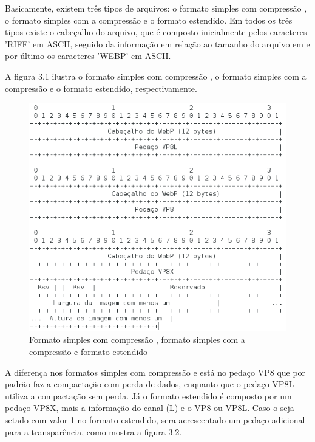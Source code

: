 \documentclass[espaco=simples,appendix=Name]{abnt}
\begin{document}
Basicamente, existem três tipos de arquivos: o formato simples com compressão , o formato simples com a compressão  e o formato estendido. Em todos os três tipos existe o cabeçalho do arquivo, que é composto inicialmente pelos caracteres 'RIFF' em ASCII, seguido da informação em relação ao tamanho do arquivo em  e por último os caracteres 'WEBP' em ASCII.

\newpage

A figura 3.1 ilustra o formato simples com compressão , o formato simples com a compressão  e o formato estendido, respectivamente.

\begin{figure}[h]
  \centering
    \includegraphics[scale=0.5]{LossyLossLessExtended.png}
  \caption{Formato simples com compressão , formato simples com a compressão  e formato estendido}
\end{figure}

A diferença nos formatos simples com compressão  e  está no pedaço VP8 que por padrão faz a compactação com perda de dados, enquanto que o pedaço VP8L utiliza a compactação sem perda. Já o formato estendido é composto por um pedaço VP8X, mais a informação do canal  (L) e o  VP8 ou VP8L. Caso o  seja setado com valor 1 no formato estendido, sera acrescentado um pedaço adicional para a transparência, como mostra a figura 3.2.
\end{document}
